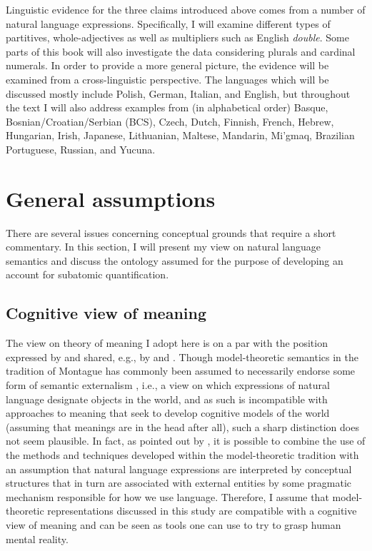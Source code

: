 Linguistic evidence for the three claims introduced above comes from a number of natural language expressions. Specifically, I will examine different types of partitives, whole-adjectives as well as multipliers such as English \textit{double}. Some parts of this book will also investigate the data considering plurals and cardinal numerals. In order to provide a more general picture, the evidence will be examined from a cross-linguistic perspective. The languages which will be discussed mostly include Polish, German, Italian, and English, but throughout the text I will also address examples from (in alphabetical order) Basque, Bosnian/Croatian/Serbian (BCS), Czech, Dutch, Finnish, French, Hebrew, Hungarian, Irish, Japanese, Lithuanian, Maltese, Mandarin, Mi'gmaq, Brazilian Portuguese, Russian, and Yucuna.

\section{General assumptions}\label{sec:general-assumptions}

There are several issues concerning conceptual grounds that require a short commentary. In this section, I will present my view on natural language semantics and discuss the ontology assumed for the purpose of developing an account for subatomic quantification. 

\subsection{Cognitive view of meaning}\label{sec:cognitive-view-of-meaning}

The view on theory of meaning I adopt here is on a par with the position expressed by \citet{krifka1998origins} and shared, e.g., by \citet{partee2018changing} and \citet{grimm2012number} \citep[see also][]{chomsky2000new}. Though model-theoretic semantics in the tradition of Montague has commonly been assumed to necessarily endorse some form of semantic externalism \citep[see, e.g.,][]{putnam1975meaning,davidson1987knowing}, i.e., a view on which expressions of natural language designate objects in the world, and as such is incompatible with approaches to meaning that seek to develop cognitive models of the world (assuming that meanings are in the head after all), such a sharp distinction does not seem plausible. In fact, as pointed out by \citeauthor{krifka1998origins}, it is possible to combine the use of the methods and techniques developed within the model-theoretic tradition with an assumption that natural language expressions are interpreted by conceptual structures that in turn are associated with external entities by some pragmatic mechanism responsible for how we use language. Therefore, I assume that model-theoretic representations discussed in this study are compatible with a cognitive view of meaning and can be seen as tools one can use to try to grasp human mental reality. 

